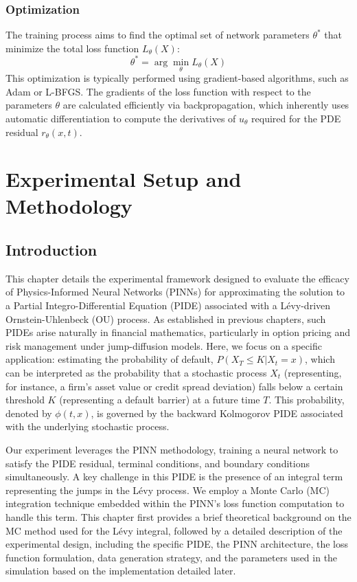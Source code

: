 \documentclass[11pt,twoside,openright]{report}
\begin{document}
\subsection{Optimization}

The training process aims to find the optimal set of network parameters $\theta^*$ that minimize the total loss function $L_{\theta}(X)$:
$$
\theta^* = \arg \min_{\theta} L_{\theta}(X)
$$
This optimization is typically performed using gradient-based algorithms, such as Adam or L-BFGS. The gradients of the loss function with respect to the parameters $\theta$ are calculated efficiently via backpropagation, which inherently uses automatic differentiation to compute the derivatives of $u_{\theta}$ required for the PDE residual $r_{\theta}(x,t)$.

\chapter{Experimental Setup and Methodology}
\label{ch:experimental_setup}

\section{Introduction}
\label{sec:exp_intro}

This chapter details the experimental framework designed to evaluate the efficacy of Physics-Informed Neural Networks (PINNs) for approximating the solution to a Partial Integro-Differential Equation (PIDE) associated with a Lévy-driven Ornstein-Uhlenbeck (OU) process. As established in previous chapters, such PIDEs arise naturally in financial mathematics, particularly in option pricing and risk management under jump-diffusion models. Here, we focus on a specific application: estimating the probability of default, $P(X_{T} \le K | X_t = x)$, which can be interpreted as the probability that a stochastic process $X_t$ (representing, for instance, a firm's asset value or credit spread deviation) falls below a certain threshold $K$ (representing a default barrier) at a future time $T$. This probability, denoted by $\phi(t, x)$, is governed by the backward Kolmogorov PIDE associated with the underlying stochastic process.

Our experiment leverages the PINN methodology, training a neural network to satisfy the PIDE residual, terminal conditions, and boundary conditions simultaneously. A key challenge in this PIDE is the presence of an integral term representing the jumps in the Lévy process. We employ a Monte Carlo (MC) integration technique embedded within the PINN's loss function computation to handle this term. This chapter first provides a brief theoretical background on the MC method used for the Lévy integral, followed by a detailed description of the experimental design, including the specific PIDE, the PINN architecture, the loss function formulation, data generation strategy, and the parameters used in the simulation based on the implementation detailed later.
\end{document}
